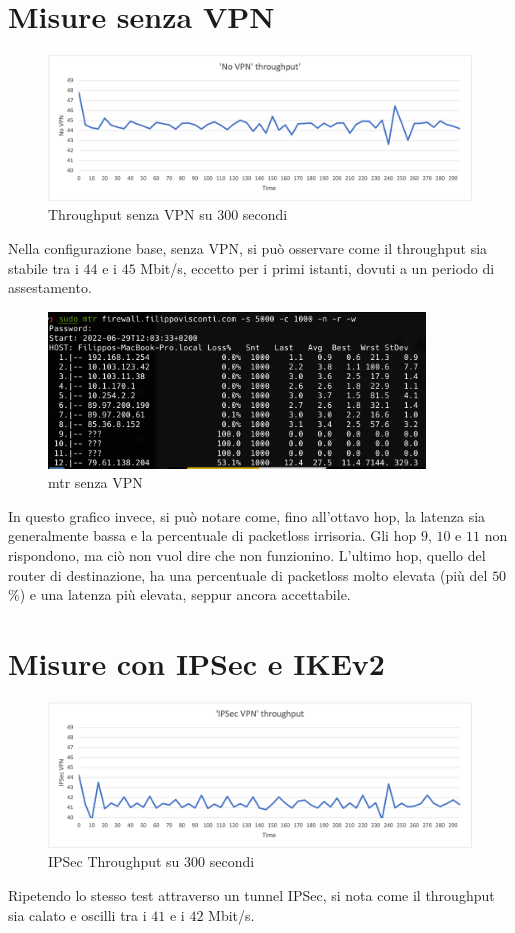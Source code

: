 \section{Misure senza VPN}
\begin{figure}[ht]
    \centering
    \includegraphics[width=12cm]{figure/vpn_thr.png-1.png}
    \caption{Throughput senza VPN su 300 secondi}
\end{figure}

Nella configurazione base, senza VPN, si può osservare come il throughput sia stabile tra i $44$ e i $45$ Mbit/s, eccetto per i primi istanti, dovuti a un periodo di assestamento.

\begin{figure}[ht]
    \centering
    \includegraphics[width=10cm]{figure/mrt_16min_noVPN.png}
    \caption{mtr senza VPN}
\end{figure}

In questo grafico invece, si può notare come, fino all'ottavo hop, la latenza sia generalmente bassa e la percentuale di packetloss irrisoria. Gli hop $9$, $10$ e $11$ non rispondono, ma ciò non vuol dire che non funzionino. L'ultimo hop, quello del router di destinazione, ha una percentuale di packetloss molto elevata (più del $50$\%) e una latenza più elevata, seppur ancora accettabile.

\section{Misure con IPSec e IKEv2}
\begin{figure}[ht]
    \centering
    \includegraphics[width=12cm]{figure/vpn_thr.png-2.png}
    \caption{IPSec Throughput su 300 secondi}
\end{figure}
Ripetendo lo stesso test attraverso un tunnel IPSec, si nota come il throughput sia calato e oscilli tra i $41$ e i $42$ Mbit/s.

